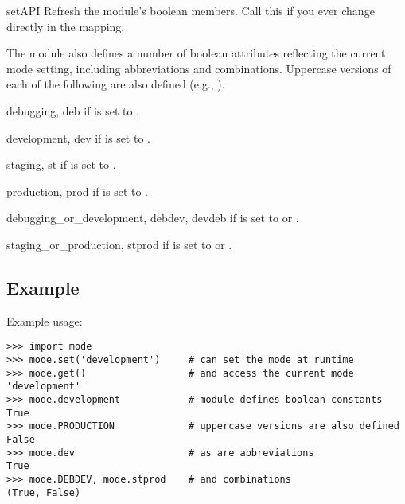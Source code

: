 \begin{funcdesc}{setAPI}{}
Refresh the module's boolean members. Call this if you ever change
 directly in the  mapping.
\end{funcdesc}

The module also defines a number of boolean attributes reflecting the current
mode setting, including abbreviations and combinations. Uppercase versions of
each of the following are also defined (e.g., ).

\begin{datadesc}{debugging, deb}
 if  is set to .
\end{datadesc}
\begin{datadesc}{development, dev}
 if  is set to .
\end{datadesc}
\begin{datadesc}{staging, st}
 if  is set to .
\end{datadesc}
\begin{datadesc}{production, prod}
 if  is set to .
\end{datadesc}
\begin{datadesc}{debugging_or_development, debdev, devdeb}
 if  is set to  or .
\end{datadesc}
\begin{datadesc}{staging_or_production, stprod}
 if  is set to  or .
\end{datadesc}


\subsection{Example}

Example usage:

\begin{verbatim}
>>> import mode
>>> mode.set('development')     # can set the mode at runtime
>>> mode.get()                  # and access the current mode
'development'
>>> mode.development            # module defines boolean constants
True
>>> mode.PRODUCTION             # uppercase versions are also defined
False
>>> mode.dev                    # as are abbreviations
True
>>> mode.DEBDEV, mode.stprod    # and combinations
(True, False)
\end{verbatim}